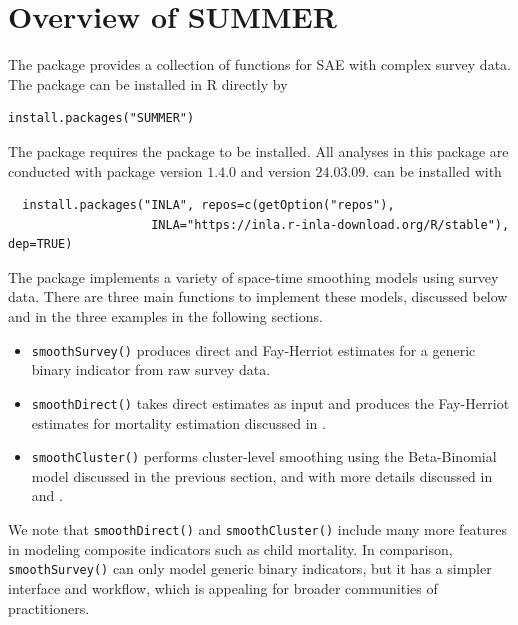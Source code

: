 \section{Overview of SUMMER}\label{sec:summer-overview}

The  package provides a collection of functions for SAE with complex survey data. The package can be installed in R directly by

\begin{verbatim}
install.packages("SUMMER")
\end{verbatim}

The  package requires the  package \citep{rue_etal_09} to be installed. All analyses in this package are conducted with  package version \(1.4.0\) and  version \(24.03.09\).  can be installed with

\begin{verbatim}
  install.packages("INLA", repos=c(getOption("repos"),
                    INLA="https://inla.r-inla-download.org/R/stable"), dep=TRUE)
\end{verbatim}

The  package implements a variety of space-time smoothing models using survey data. There are three main functions to implement these models, discussed below and in the three examples in the following sections.

\begin{itemize}
\tightlist
\item
  \texttt{smoothSurvey()} produces direct and Fay-Herriot estimates for a generic binary indicator from raw survey data.
\item
  \texttt{smoothDirect()} takes direct estimates as input and produces the Fay-Herriot estimates for mortality estimation discussed in \citet{li_etal_19}.
\item
  \texttt{smoothCluster()} performs cluster-level smoothing using the Beta-Binomial model discussed in the previous section, and with more details discussed in \citet{wu2021spatial} and \citet{fuglstad2021two}.
\end{itemize}

We note that \texttt{smoothDirect()} and \texttt{smoothCluster()} include many more features in modeling composite indicators such as child mortality. In comparison, \texttt{smoothSurvey()} can only model generic binary indicators, but it has a simpler interface and workflow, which is appealing for broader communities of practitioners.

